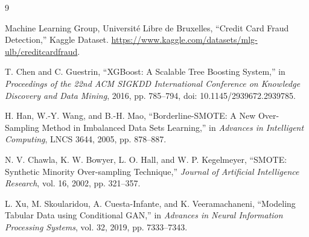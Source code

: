 \documentclass[12pt,a4paper]{article}
\begin{document}
\clearpage
\renewcommand{\refname}{Tài liệu tham khảo}
\begin{thebibliography}{9}

Machine Learning Group, Université Libre de Bruxelles,
``Credit Card Fraud Detection,'' Kaggle Dataset.
\url{https://www.kaggle.com/datasets/mlg-ulb/creditcardfraud}.

T. Chen and C. Guestrin,
``XGBoost: A Scalable Tree Boosting System,''
in \textit{Proceedings of the 22nd ACM SIGKDD International Conference on Knowledge Discovery and Data Mining},
2016, pp. 785--794, doi: 10.1145/2939672.2939785.

H. Han, W.-Y. Wang, and B.-H. Mao,
``Borderline-SMOTE: A New Over-Sampling Method in Imbalanced Data Sets Learning,''
in \textit{Advances in Intelligent Computing}, LNCS 3644,
2005, pp. 878--887.

N. V. Chawla, K. W. Bowyer, L. O. Hall, and W. P. Kegelmeyer,
``SMOTE: Synthetic Minority Over-sampling Technique,''
\textit{Journal of Artificial Intelligence Research}, vol. 16,
2002, pp. 321--357.

L. Xu, M. Skoularidou, A. Cuesta-Infante, and K. Veeramachaneni,
``Modeling Tabular Data using Conditional GAN,''
in \textit{Advances in Neural Information Processing Systems}, vol. 32,
2019, pp. 7333--7343.

\end{thebibliography}
\end{document}
